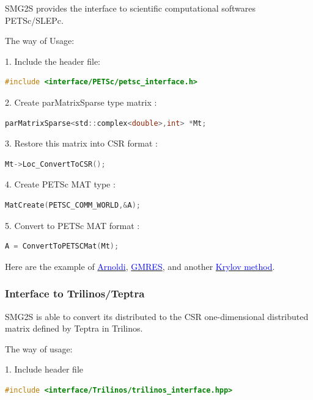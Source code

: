 SMG2S provides the interface to scientific computational softwares PETSc/SLEPc.

The way of Usage:

1. Include the header file:
\begin{lstlisting}[language=C,frame=single]
#include <interface/PETSc/petsc_interface.h>
\end{lstlisting}

2. Create parMatrixSparse type matrix :
\begin{lstlisting}[language=C,frame=single]
parMatrixSparse<std::complex<double>,int> *Mt;
\end{lstlisting}

3. Restore this matrix into CSR format :
\begin{lstlisting}[language=C,frame=single]
Mt->Loc_ConvertToCSR();
\end{lstlisting}

4. Create PETSc MAT type :
\begin{lstlisting}[language=C,frame=single]
MatCreate(PETSC_COMM_WORLD,&A); 
\end{lstlisting}

5. Convert to PETSc MAT format :

\begin{lstlisting}[language=C,frame=single]
A = ConvertToPETSCMat(Mt); 
\end{lstlisting}

Here are the example of \href{https://github.com/SMG2S/SMG2S/tree/master/example/arnoldi}{\textcolor{blue}{Arnoldi}}, \href{https://github.com/SMG2S/SMG2S/tree/master/example/gmres}{\textcolor{blue}{GMRES}}, and another  \href{https://github.com/SMG2S/SMG2S/tree/master/example/krylov}{\textcolor{blue}{Krylov method}}.

\subsubsection{Interface to Trilinos/Teptra}

SMG2S is able to convert its distributed to the CSR one-dimensional distributed matrix defined by Teptra in Trilinos.

The way of usage:

1. Include header file

\begin{lstlisting}[language=C++,frame=single]
#include <interface/Trilinos/trilinos_interface.hpp>
\end{lstlisting}

